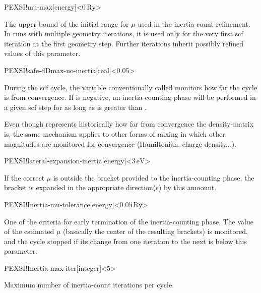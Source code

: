\begin{fdfentry}{PEXSI!mu-max}[energy]<$0\,\mathrm{Ry}$>

  The upper bound of the initial range for $\mu$ used in the
  inertia-count refinement. In runs with multiple geometry iterations,
  it is used only for the very first scf iteration at the first
  geometry step. Further iterations inherit possibly refined values of
  this parameter.

\end{fdfentry}

\begin{fdfentry}{PEXSI!safe-dDmax-no-inertia}[real]<0.05>

  During the scf cycle, the variable conventionally called
   monitors how far the cycle is from convergence. If
   is negative, an inertia-counting phase
  will be performed in a given scf step for as long as  is
  greater than .

  \note Even though  represents historically how far from
  convergence the density-matrix is, the same mechanism applies to
  other forms of mixing in which other magnitudes are monitored for
  convergence (Hamiltonian, charge density...).
  
\end{fdfentry}

\begin{fdfentry}{PEXSI!lateral-expansion-inertia}[energy]<$3\,\mathrm{eV}$>

  If the correct $\mu$ is outside the bracket provided to the
  inertia-counting phase, the bracket is expanded in the appropriate
  direction(s) by this amoount.

\end{fdfentry}

\begin{fdfentry}{PEXSI!Inertia-mu-tolerance}[energy]<$0.05\,\mathrm{Ry}$>

  One of the criteria for early termination of the inertia-counting
  phase.  The value of the estimated $\mu$ (basically the center of
  the resulting brackets) is monitored, and the cycle stopped if its
  change from one iteration to the next is below this parameter.
  
\end{fdfentry}

\begin{fdfentry}{PEXSI!Inertia-max-iter}[integer]<$5$>

  Maximum number of inertia-count iterations per cycle.

\end{fdfentry}

